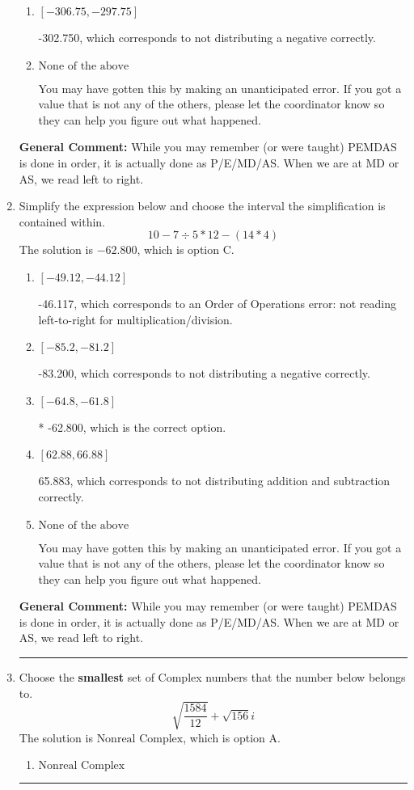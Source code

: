 \documentclass{extbook}[14pt]
\newcommand{\litem}[1]{\item #1

\rule{\textwidth}{0.4pt}}
\begin{document}
\begin{enumerate}
{\begin{enumerate}[label=\Alph*.]
* -133.250, which is the correct option.
\item \( [-306.75, -297.75] \)

 -302.750, which corresponds to not distributing a negative correctly.
\item \( \text{None of the above} \)

 You may have gotten this by making an unanticipated error. If you got a value that is not any of the others, please let the coordinator know so they can help you figure out what happened.
\end{enumerate}

\textbf{General Comment:} While you may remember (or were taught) PEMDAS is done in order, it is actually done as P/E/MD/AS. When we are at MD or AS, we read left to right.
}
\litem{
Simplify the expression below and choose the interval the simplification is contained within.
\[ 10 - 7 \div 5 * 12 - (14 * 4) \]The solution is \( -62.800 \), which is option C.\begin{enumerate}[label=\Alph*.]
\item \( [-49.12, -44.12] \)

 -46.117, which corresponds to an Order of Operations error: not reading left-to-right for multiplication/division.
\item \( [-85.2, -81.2] \)

 -83.200, which corresponds to not distributing a negative correctly.
\item \( [-64.8, -61.8] \)

* -62.800, which is the correct option.
\item \( [62.88, 66.88] \)

 65.883, which corresponds to not distributing addition and subtraction correctly.
\item \( \text{None of the above} \)

 You may have gotten this by making an unanticipated error. If you got a value that is not any of the others, please let the coordinator know so they can help you figure out what happened.
\end{enumerate}

\textbf{General Comment:} While you may remember (or were taught) PEMDAS is done in order, it is actually done as P/E/MD/AS. When we are at MD or AS, we read left to right.
}
\litem{
Choose the \textbf{smallest} set of Complex numbers that the number below belongs to.
\[ \sqrt{\frac{1584}{12}}+\sqrt{156} i \]The solution is \( \text{Nonreal Complex} \), which is option A.\begin{enumerate}[label=\Alph*.]
\item \( \text{Nonreal Complex} \)


\end{enumerate}}
\end{enumerate}
\end{document}
